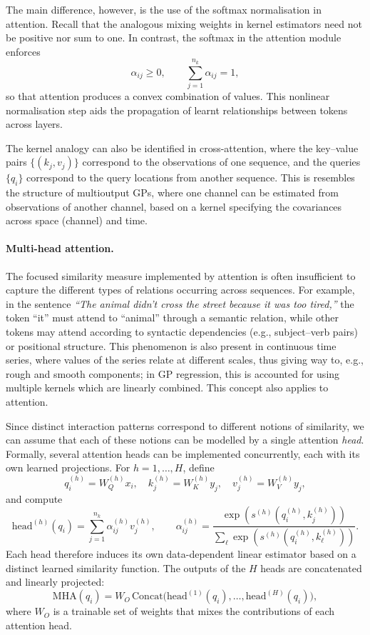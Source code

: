 The main difference, however, is the use of the softmax normalisation in attention. Recall that the analogous mixing weights in kernel estimators need not be positive nor sum to one. In contrast, the softmax in the attention module enforces
\[
\alpha_{ij} \ge 0,
\qquad
\sum_{j=1}^{n_k} \alpha_{ij} = 1,
\]
so that attention produces a convex combination of values.
This nonlinear normalisation step aids the propagation of learnt relationships between tokens across layers.

The kernel analogy can also be identified in cross-attention, where the key–value pairs $\{(k_j,v_j)\}$ correspond to the observations of one sequence, and the queries $\{q_i\}$ correspond to the query locations from another sequence. This is resembles the structure of multioutput GPs, where one channel can be estimated from  observations of another channel, based on a kernel specifying the covariances across space (channel) and time.

\paragraph{Multi-head attention.}
The focused similarity measure implemented by attention is often insufficient to capture the different types of relations occurring  across sequences. For example, in the sentence \emph{“The animal didn’t cross the street because it was too tired,”} the token “it” must attend to “animal” through a semantic relation, while other tokens may attend according to syntactic dependencies (e.g., subject–verb pairs) or positional structure. This phenomenon is also present in continuous time series, where values of the series relate at different scales, thus giving way to, e.g., rough and smooth components; in GP regression, this is accounted for using multiple kernels which are linearly combined. This concept also applies to attention. 

Since distinct interaction patterns correspond to different notions of similarity, we can assume that each of these notions can be modelled by a single attention \emph{head}. Formally, several attention heads can be implemented concurrently, each with its own learned projections.
For $h = 1,\dots,H$, define
\[
q_i^{(h)} = W_Q^{(h)} x_i,
\quad
k_j^{(h)} = W_K^{(h)} y_j,
\quad
v_j^{(h)} = W_V^{(h)} y_j,
\]
and compute
\[
\mathrm{head}^{(h)}(q_i)
=
\sum_{j=1}^{n_k}
\alpha_{ij}^{(h)} v_j^{(h)},
\qquad
\alpha_{ij}^{(h)}
=
\frac{\exp\!\left(s^{(h)}(q_i^{(h)},k_j^{(h)})\right)}
{\sum_{\ell} \exp\!\left(s^{(h)}(q_i^{(h)},k_\ell^{(h)})\right)}.
\]
Each head therefore induces its own data-dependent linear estimator
based on a distinct learned similarity function. The outputs of the
$H$ heads are concatenated and linearly projected:
\[
\mathrm{MHA}(q_i)
=
W_O \,
\mathrm{Concat}\big(
\mathrm{head}^{(1)}(q_i),\dots,\mathrm{head}^{(H)}(q_i)
\big),
\]
where $W_O$ is a trainable set of weights that mixes the contributions of each attention head.


